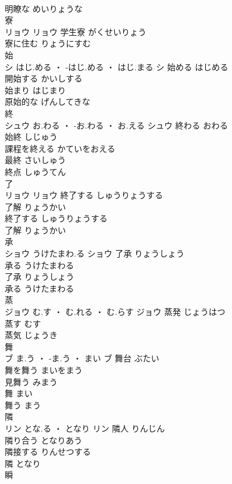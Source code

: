 \documentclass[8pt]{extreport}
\begin{document}
\begin{CJK}{UTF8}{min}
\\	明瞭な	めいりょうな	
\\	寮	
\\	リョウ		リョウ	学生寮	がくせいりょう	
\\	寮に住む	りょうにすむ	
\\	始	
\\	シ	はじ.める ・ -はじ.める ・ はじ.まる	シ	始める	はじめる	
\\	開始する	かいしする	
\\	始まり	はじまり	
\\	原始的な	げんしてきな	
\\	終	
\\	シュウ	お.わる ・ -お.わる ・ お.える	シュウ	終わる	おわる	
\\	始終	しじゅう	
\\	課程を終える	かていをおえる	
\\	最終	さいしゅう	
\\	終点	しゅうてん	
\\	了	
\\	リョウ		リョウ	終了する	しゅうりょうする	
\\	了解	りょうかい	
\\	終了する	しゅうりょうする	
\\	了解	りょうかい	
\\	承	
\\	ショウ	うけたまわ.る	ショウ	了承	りょうしょう	
\\	承る	うけたまわる	
\\	了承	りょうしょう	
\\	承る	うけたまわる	
\\	蒸	
\\	ジョウ	む.す ・ む.れる ・ む.らす	ジョウ	蒸発	じょうはつ	
\\	蒸す	むす	
\\	蒸気	じょうき	
\\	舞	
\\	ブ	ま.う ・ -ま.う ・ まい	ブ	舞台	ぶたい	
\\	舞を舞う	まいをまう	
\\	見舞う	みまう	
\\	舞	まい	
\\	舞う	まう	
\\	隣	
\\	リン	とな.る ・ となり	リン	隣人	りんじん	
\\	隣り合う	となりあう	
\\	隣接する	りんせつする	
\\	隣	となり	
\\	瞬	

\end{CJK}
\end{document}
